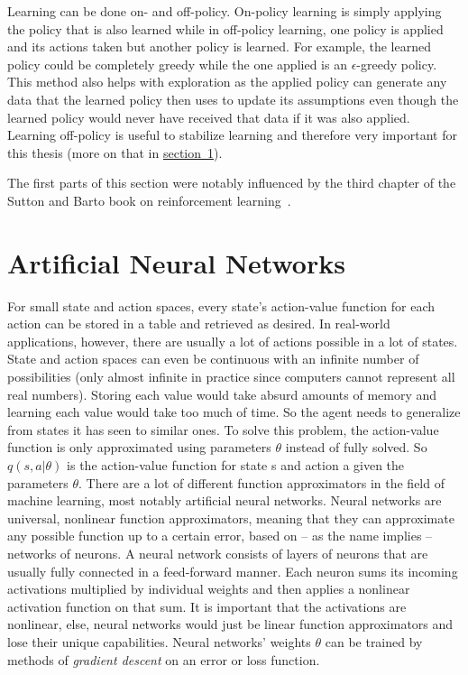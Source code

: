 \documentclass[a4paper,titlepage]{article}
\begin{document}
Learning can be done on- and off-policy. On-policy learning is simply applying the policy that is also learned while in off-policy learning, one policy is applied and its actions taken but another policy is learned. For example, the learned policy could be completely greedy while the one applied is an $\epsilon$-greedy policy. This method also helps with exploration as the applied policy can generate any data that the learned policy then uses to update its assumptions even though the learned policy would never have received that data if it was also applied. Learning off-policy is useful to stabilize learning and therefore very important for this thesis (more on that in \hyperref[sec:anns]{section~\ref*{sec:anns}}). \medskip

The first parts of this section were notably influenced by the third chapter of the Sutton and Barto book on reinforcement learning~\cite{book}.

\newpage

\section{Artificial Neural Networks}
\label{sec:anns}

For small state and action spaces, every state's action-value function for each action can be stored in a table and retrieved as desired. In real-world applications, however, there are usually a lot of actions possible in a lot of states. State and action spaces can even be continuous with an infinite number of possibilities (only almost infinite in practice since computers cannot represent all real numbers). Storing each value would take absurd amounts of memory and learning each value would take too much of time. So the agent needs to generalize from states it has seen to similar ones. To solve this problem, the action-value function is only approximated using parameters $\theta$ instead of fully solved. So $q(s, a | \theta)$ is the action-value function for state s and action a given the parameters $\theta$. There are a lot of different function approximators in the field of machine learning, most notably artificial neural networks. Neural networks are universal, nonlinear function approximators, meaning that they can approximate any possible function up to a certain error, based on -- as the name implies -- networks of neurons. A neural network consists of layers of neurons that are usually fully connected in a feed-forward manner. Each neuron sums its incoming activations multiplied by individual weights and then applies a nonlinear activation function on that sum.  %
It is important that the activations are nonlinear, else, neural networks would just be linear function approximators and lose their unique capabilities.
Neural networks' weights $\theta$ can be trained by methods of \emph{gradient descent} on an error or loss function. %
\end{document}
